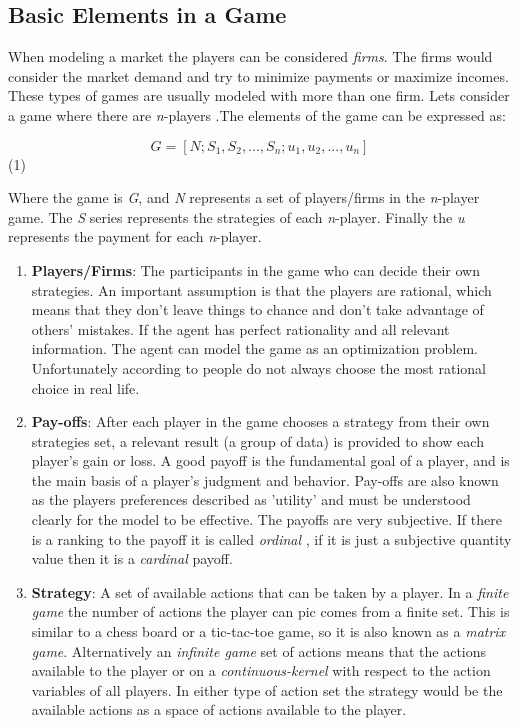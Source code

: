 \documentclass[phd, 12pt, print]{fauthesis}
\begin{document}
\subsection{Basic Elements in a Game}

When modeling a market the players can be considered \textit{firms}. The firms would 
consider the market demand and try to minimize payments or maximize incomes. These types of  
games are usually modeled with more than one firm. Lets consider a game where there are 
\textit{n}-players \cite{Cheng}.The elements of the game can be expressed as:

$$G = [N;S_{1},S_{2},...,S_{n};u_{1},u_{2},...,u_{n}]$$ (1)

Where the game is \textit{G}, and \textit{N} represents a set of players/firms 
in the \textit{n}-player game. The \textit{S} series represents the strategies 
of each \textit{n}-player. Finally the \textit{u} represents the payment for 
each \textit{n}-player. 

\begin{enumerate}
\item \textbf{Players/Firms}: The participants in the game who can decide their own strategies.
An important assumption is that the players are rational, which means that they don’t 
leave things to chance and don’t take advantage of others’ mistakes.\cite{Mediwaththe} If the agent has perfect
rationality and all relevant information. The agent can model the game as an optimization problem. 
Unfortunately according to \cite{Mediwaththe} people do not always choose the most 
rational choice in real life.
\item \textbf{Pay-offs}: After each player in the game chooses a  strategy
from  their  own  strategies  set,  a  relevant  result  
(a  group of data) is provided to show each player’s gain or loss.
A good payoff is the fundamental goal of a player, and is the main
basis of a player’s judgment and behavior. Pay-offs are also known
as the players preferences described as 'utility' and must be 
understood clearly for the model to be effective. The payoffs are
very subjective. If there is a ranking to the payoff it is called 
\textit{ordinal} , if it is just a subjective quantity value then it is 
a \textit{cardinal} payoff.\cite{Mediwaththe}
\item \textbf{Strategy}: 
A set of available actions that can be taken by a player. In a \textit{finite game} the 
number of actions the player can pic comes from a finite set. This is similar to 
a chess board or a tic-tac-toe game, so it is also known as a \textit{matrix game}.\cite{Zhang} 
Alternatively an \textit{infinite game} set of actions means that the actions available 
to the player or on a \textit{continuous-kernel} with respect to the action variables 
of all players. In either type of action set the strategy would be the available actions as a 
space of actions available to the player.\cite{Zhang} 
\end{enumerate}
\end{document}
